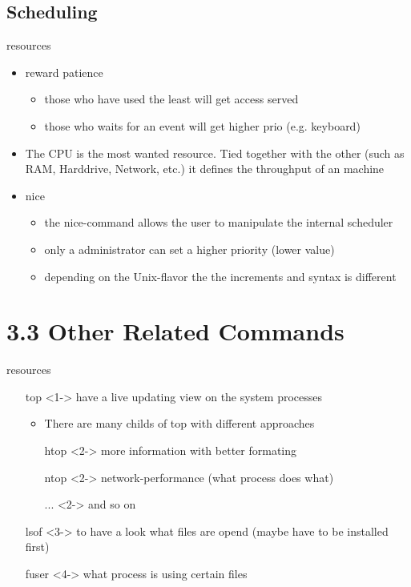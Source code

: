 \documentclass[hyperref={pdfpagelabels=false}]{beamer}
\begin{document}
    \subsection{Scheduling}
        \begin{frame}{resources}
            \begin{itemize}
                \item<1-> reward patience
                \begin{itemize}
                    \item<1-> those who have used the least will get access served
                    \item<2-> those who waits for an event will get higher prio (e.g. keyboard)
                \end{itemize}
                \item<3-> The CPU is the most wanted resource. Tied together with the other (such as RAM, Harddrive, Network, etc.) it defines the throughput of an machine
                \item<4-> nice
                \begin{itemize}
                    \item<5-> the nice-command allows the user to manipulate the internal scheduler
                    \item<6-> only a administrator can set a higher priority (lower value)
                    \item<7-> depending on the Unix-flavor the the increments and syntax is different
                \end{itemize}
            \end{itemize}
        \end{frame}
\section{3.3 Other Related Commands}
    \begin{frame}{resources}
        \begin{itemize}
            \item[top]<1-> have a live updating view on the system processes
            \begin{itemize}
                \item<2-> There are many childs of top with different approaches
                \item[htop]<2-> more information with better formating
                \item[ntop]<2-> network-performance (what process does what)
                \item[...]<2-> and so on
            \end{itemize}
            \item[lsof]<3-> to have a look what files are opend (maybe have to be installed first)
            \item[fuser]<4-> what process is using certain files
        \end{itemize}
    \end{frame}
\end{document}
